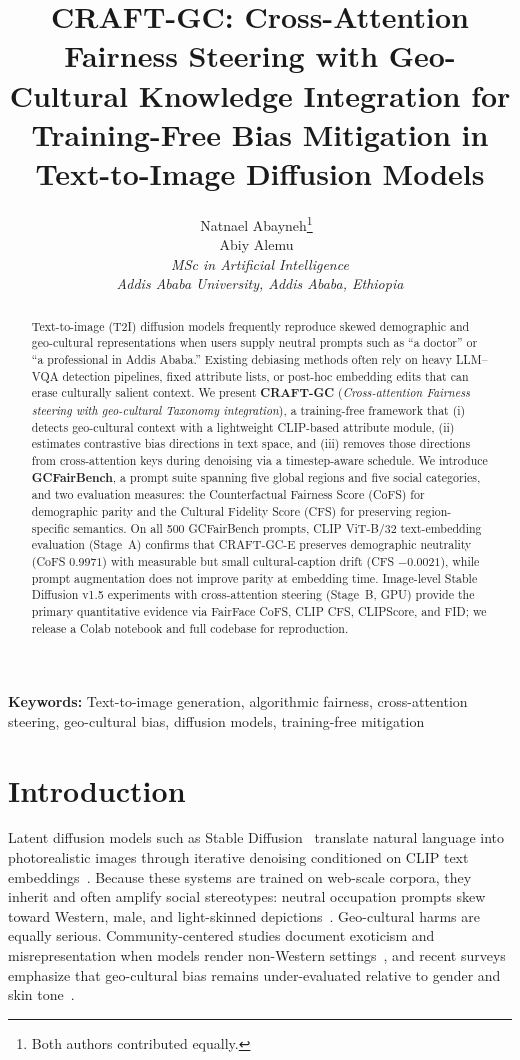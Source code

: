 \documentclass[11pt,a4paper]{article}
\title{%
  \textbf{CRAFT-GC: Cross-Attention Fairness Steering with Geo-Cultural Knowledge Integration for Training-Free Bias Mitigation in Text-to-Image Diffusion Models}%
}
\author{%
  Natnael Abayneh\thanks{Both authors contributed equally.}\ \email{natnael.abayneh-ug@aau.edu.et} \\
  Abiy Alemu\footnotemark[1]\ \email{abiyalemu@aau.edu.et} \\[0.4em]
  \textit{MSc in Artificial Intelligence} \\
  \textit{Addis Ababa University, Addis Ababa, Ethiopia}%
}
\date{}
\begin{document}
\maketitle

\begin{abstract}
Text-to-image (T2I) diffusion models frequently reproduce skewed demographic and geo-cultural representations when users supply neutral prompts such as ``a doctor'' or ``a professional in Addis Ababa.'' Existing debiasing methods often rely on heavy LLM--VQA detection pipelines, fixed attribute lists, or post-hoc embedding edits that can erase culturally salient context. We present \textbf{CRAFT-GC} (\textit{Cross-attention Fairness steering with geo-cultural Taxonomy integration}), a training-free framework that (i) detects geo-cultural context with a lightweight CLIP-based attribute module, (ii) estimates contrastive bias directions in text space, and (iii) removes those directions from cross-attention keys during denoising via a timestep-aware schedule. We introduce \textbf{GCFairBench}, a prompt suite spanning five global regions and five social categories, and two evaluation measures: the Counterfactual Fairness Score (CoFS) for demographic parity and the Cultural Fidelity Score (CFS) for preserving region-specific semantics. On all 500 GCFairBench prompts, CLIP ViT-B/32 text-embedding evaluation (Stage~A) confirms that CRAFT-GC-E preserves demographic neutrality (CoFS $0.9971$) with measurable but small cultural-caption drift (CFS $-0.0021$), while prompt augmentation does not improve parity at embedding time. Image-level Stable Diffusion v1.5 experiments with cross-attention steering (Stage~B, GPU) provide the primary quantitative evidence via FairFace CoFS, CLIP CFS, CLIPScore, and FID; we release a Colab notebook and full codebase for reproduction.
\end{abstract}

\noindent\textbf{Keywords:} Text-to-image generation, algorithmic fairness, cross-attention steering, geo-cultural bias, diffusion models, training-free mitigation

\section{Introduction}
\label{sec:intro}

Latent diffusion models such as Stable Diffusion~\cite{rombach2022ldm} translate natural language into photorealistic images through iterative denoising conditioned on CLIP text embeddings~\cite{radford2021clip}. Because these systems are trained on web-scale corpora, they inherit and often amplify social stereotypes: neutral occupation prompts skew toward Western, male, and light-skinned depictions~\cite{bianchi2023accessible,luccioni2023stablebias,naik2023social}. Geo-cultural harms are equally serious. Community-centered studies document exoticism and misrepresentation when models render non-Western settings~\cite{ghosh2024nonwestern}, and recent surveys emphasize that geo-cultural bias remains under-evaluated relative to gender and skin tone~\cite{wan2024survey,elsharif2025cultural}.
\end{document}
